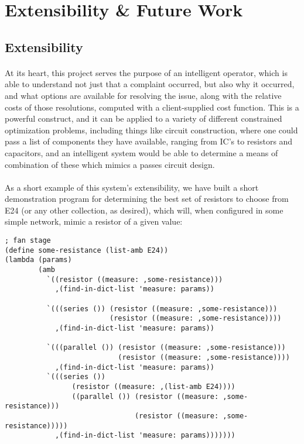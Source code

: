\newpage
\section{Extensibility \& Future Work}
\subsection{Extensibility}
\paragraph{}
At its heart, this project serves the purpose of an intelligent  operator, which is able to understand not just that a complaint occurred, but also why it occurred, and what options are available for resolving the issue, along with the relative costs of those resolutions, computed with a client-supplied cost function. This is a powerful construct, and it can be applied to a variety of different constrained optimization problems, including things like circuit construction, where one could pass a list of components they have available, ranging from IC's to resistors and capacitors, and an intelligent system would be able to determine a means of combination of these which mimics a passes circuit design.

\paragraph{}
As a short example of this system's extensibility, we have built a short demonstration program for determining the best set of resistors to choose from E24 (or any other collection, as desired), which will, when configured in some simple network, mimic a resistor of a given value:

\begin{verbatim}
; fan stage
(define some-resistance (list-amb E24))
(lambda (params)
        (amb
          `((resistor ((measure: ,some-resistance)))
            ,(find-in-dict-list 'measure: params))

          `(((series ()) (resistor ((measure: ,some-resistance)))
                         (resistor ((measure: ,some-resistance))))
            ,(find-in-dict-list 'measure: params))

          `(((parallel ()) (resistor ((measure: ,some-resistance)))
                           (resistor ((measure: ,some-resistance))))
            ,(find-in-dict-list 'measure: params))
          `(((series ())
                (resistor ((measure: ,(list-amb E24))))
                ((parallel ()) (resistor ((measure: ,some-resistance)))
                               (resistor ((measure: ,some-resistance)))))
            ,(find-in-dict-list 'measure: params)))))))

\end{verbatim}
